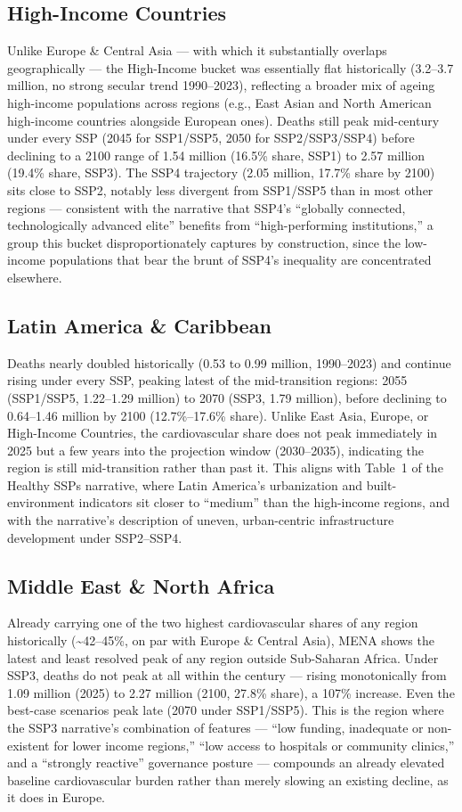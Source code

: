 \subsection*{High-Income Countries}
Unlike Europe \& Central Asia — with which it substantially overlaps geographically — the High-Income bucket was essentially flat historically (3.2--3.7 million, no strong secular trend 1990--2023), reflecting a broader mix of ageing high-income populations across regions (e.g., East Asian and North American high-income countries alongside European ones). Deaths still peak mid-century under every SSP (2045 for SSP1/SSP5, 2050 for SSP2/SSP3/SSP4) before declining to a 2100 range of 1.54 million (16.5\% share, SSP1) to 2.57 million (19.4\% share, SSP3). The SSP4 trajectory (2.05 million, 17.7\% share by 2100) sits close to SSP2, notably less divergent from SSP1/SSP5 than in most other regions — consistent with the narrative that SSP4's ``globally connected, technologically advanced elite'' benefits from ``high-performing institutions,'' a group this bucket disproportionately captures by construction, since the low-income populations that bear the brunt of SSP4's inequality are concentrated elsewhere.

\subsection*{Latin America \& Caribbean}
Deaths nearly doubled historically (0.53 to 0.99 million, 1990--2023) and continue rising under every SSP, peaking latest of the mid-transition regions: 2055 (SSP1/SSP5, 1.22--1.29 million) to 2070 (SSP3, 1.79 million), before declining to 0.64--1.46 million by 2100 (12.7\%--17.6\% share). Unlike East Asia, Europe, or High-Income Countries, the cardiovascular share does not peak immediately in 2025 but a few years into the projection window (2030--2035), indicating the region is still mid-transition rather than past it. This aligns with Table~1 of the Healthy SSPs narrative, where Latin America's urbanization and built-environment indicators sit closer to ``medium'' than the high-income regions, and with the narrative's description of uneven, urban-centric infrastructure development under SSP2--SSP4.

\subsection*{Middle East \& North Africa}
Already carrying one of the two highest cardiovascular shares of any region historically (\textasciitilde42--45\%, on par with Europe \& Central Asia), MENA shows the latest and least resolved peak of any region outside Sub-Saharan Africa. Under SSP3, deaths do not peak at all within the century — rising monotonically from 1.09 million (2025) to 2.27 million (2100, 27.8\% share), a 107\% increase. Even the best-case scenarios peak late (2070 under SSP1/SSP5). This is the region where the SSP3 narrative's combination of features — ``low funding, inadequate or non-existent for lower income regions,'' ``low access to hospitals or community clinics,'' and a ``strongly reactive'' governance posture — compounds an already elevated baseline cardiovascular burden rather than merely slowing an existing decline, as it does in Europe.

